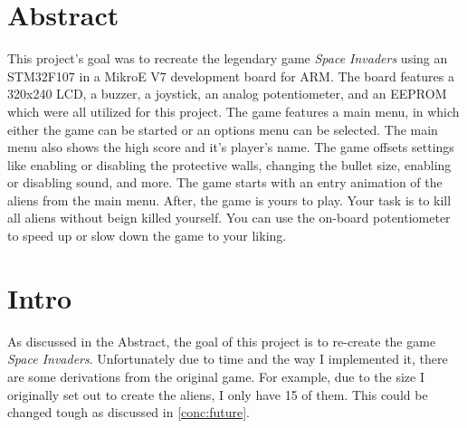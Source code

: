 \documentclass[12pt, a4paper]{article}
\begin{document}
    \thispagestyle{empty}
    \hspace{0pt}
    \vfill
    \section*{\centering Abstract}
    \begin{center}
    This project's goal was to recreate the legendary game \textit{Space Invaders} using an STM32F107 in a MikroE V7 development board for ARM. The board features a 320x240 LCD, a buzzer, a joystick, an analog potentiometer, and an EEPROM which were all utilized for this project. The game features a main menu, in which either the game can be started or an options menu can be selected. The main menu also shows the high score and it's player's name. The game offsets settings like enabling or disabling the protective walls, changing the bullet size, enabling or disabling sound, and more. The game starts with an entry animation of the aliens from the main menu. After, the game is yours to play. Your task is to kill all aliens without beign killed yourself. You can use the on-board potentiometer to speed up or slow down the game to your liking. 
    \end{center}
    \vfill
    \hspace{0pt}

    \newpage
    \thispagestyle{empty}
    \tableofcontents
    \newpage
    
    \section{Intro}
    As discussed in the Abstract, the goal of this project is to re-create the game \textit{Space Invaders}. Unfortunately due to time and the way I implemented it, there are some derivations from the original game. For example, due to the size I originally set out to create the aliens, I only have 15 of them. This could be changed tough as discussed in \cref{conc:future}.
    
\end{document}

